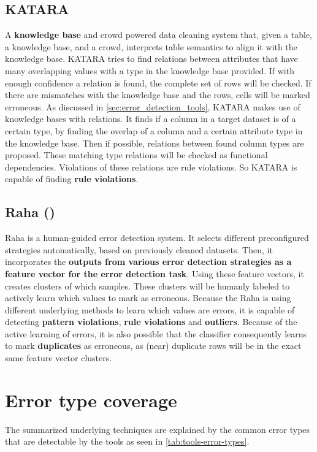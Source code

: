 \subsection{KATARA \cite{Chu2015-fs}}
A \textbf{knowledge base} and crowd powered data cleaning system that, given a table, a knowledge base, and a crowd, interprets table semantics to align it with the knowledge base. KATARA tries to find relations between attributes that have many overlapping values with a type in the knowledge base provided. If with enough confidence a relation is found, the complete set of rows will be checked. If there are mismatches with the knowledge base and the rows, cells will be marked erroneous. 
As discussed in \autoref{sec:error_detection_tools}, KATARA makes use of knowledge bases with relations. It finds if a column in a target dataset is of a certain type, by finding the overlap of a column and a certain attribute type in the knowledge base. Then if possible, relations between found column types are proposed. These matching type relations will be checked as functional dependencies. Violations of these relations are rule violations. So KATARA is capable of finding \textbf{rule violations}.

\subsection{Raha (\cite{Mahdavi2019-zf})}
Raha is a human-guided error detection system. It selects different preconfigured strategies automatically, based on previously cleaned datasets. Then, it incorporates the \textbf{outputs from various error detection strategies as a feature vector for the error detection task}. Using these feature vectors, it creates clusters of which samples. These clusters will be humanly labeled to actively learn which values to mark as erroneous. 
Because the Raha is using different underlying methods to learn which values are errors, it is capable of detecting \textbf{pattern violations}, \textbf{rule violations} and \textbf{outliers}. Because of the active learning of errors, it is also possible that the classifier consequently learns to mark \textbf{duplicates} as erroneous, as (near) duplicate rows will be in the exact same feature vector clusters. 

\newpage
\section{Error type coverage}
\label{sec:error_type_coverage}
The summarized underlying techniques are explained by the common error types that are detectable by the tools as seen in \autoref{tab:tools-error-types}.

